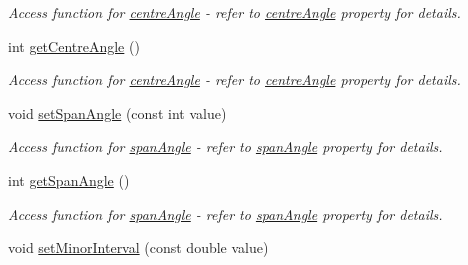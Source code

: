 \begin{DoxyCompactItemize}
\begin{DoxyCompactList}\small\item\em Access function for \hyperlink{classQEAnalogIndicator_a8d0b385d12db1960b0d6b9266a1027f0}{centreAngle} -\/ refer to \hyperlink{classQEAnalogIndicator_a8d0b385d12db1960b0d6b9266a1027f0}{centreAngle} property for details. \end{DoxyCompactList}\item 
\hypertarget{classQEAnalogIndicator_ac7444b9c4783f5c60fbad31481e09a3f}{
int \hyperlink{classQEAnalogIndicator_ac7444b9c4783f5c60fbad31481e09a3f}{getCentreAngle} ()}
\label{classQEAnalogIndicator_ac7444b9c4783f5c60fbad31481e09a3f}

\begin{DoxyCompactList}\small\item\em Access function for \hyperlink{classQEAnalogIndicator_a8d0b385d12db1960b0d6b9266a1027f0}{centreAngle} -\/ refer to \hyperlink{classQEAnalogIndicator_a8d0b385d12db1960b0d6b9266a1027f0}{centreAngle} property for details. \end{DoxyCompactList}\item 
\hypertarget{classQEAnalogIndicator_aa0768aba8a3d9404ada7fd8368037c4b}{
void \hyperlink{classQEAnalogIndicator_aa0768aba8a3d9404ada7fd8368037c4b}{setSpanAngle} (const int value)}
\label{classQEAnalogIndicator_aa0768aba8a3d9404ada7fd8368037c4b}

\begin{DoxyCompactList}\small\item\em Access function for \hyperlink{classQEAnalogIndicator_a729a2313bdac9b7d6d49ecd4158d0aea}{spanAngle} -\/ refer to \hyperlink{classQEAnalogIndicator_a729a2313bdac9b7d6d49ecd4158d0aea}{spanAngle} property for details. \end{DoxyCompactList}\item 
\hypertarget{classQEAnalogIndicator_ad9dd740f2690f9bac7d23bb1cd3b744c}{
int \hyperlink{classQEAnalogIndicator_ad9dd740f2690f9bac7d23bb1cd3b744c}{getSpanAngle} ()}
\label{classQEAnalogIndicator_ad9dd740f2690f9bac7d23bb1cd3b744c}

\begin{DoxyCompactList}\small\item\em Access function for \hyperlink{classQEAnalogIndicator_a729a2313bdac9b7d6d49ecd4158d0aea}{spanAngle} -\/ refer to \hyperlink{classQEAnalogIndicator_a729a2313bdac9b7d6d49ecd4158d0aea}{spanAngle} property for details. \end{DoxyCompactList}\item 
\hypertarget{classQEAnalogIndicator_a963a9f0b29b99b218f12d28d27a8d150}{
void \hyperlink{classQEAnalogIndicator_a963a9f0b29b99b218f12d28d27a8d150}{setMinorInterval} (const double value)}
\label{classQEAnalogIndicator_a963a9f0b29b99b218f12d28d27a8d150}


\end{DoxyCompactItemize}
